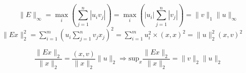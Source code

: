 {\begin{enumerate}
{$$\|E\|_{\infty }= \max_i\left(\sum_{j=1}^n|u_iv_j|\right) =\max_i\left(|u_i|\sum_{j=1}^n|v_j|\right)=\|v\|_1\|u\|_{\infty}$$
$\|Ex\|_2^2=\sum_{i=1}^m\left(u_i\sum_{j=1}^n v_jx_j\right)^2 =\sum_{i=1}^mu_i^2 \times (x,x)^2=\|u\|_2^2 (x,v)^2$

$$\frac{\|Ex\|_2}{\|x\|_2}=\frac{(x,v)}{\|x\|_2} \|u\|_2 \Rightarrow \mbox{sup}_x\frac{\|Ex\|_2}{\|x\|_2}=\|v\|_2\|u\|_2$$}
\end{enumerate}
}